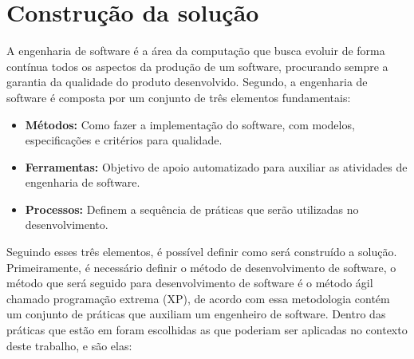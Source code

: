 \section{Construção da solução}
\label{section:construcao}

A engenharia de software é a área da computação que busca evoluir de forma contínua
todos os aspectos da produção de um software, procurando sempre a garantia da
qualidade do produto desenvolvido. Segundo\cite{pressman2011engenharia}, a engenharia
de software é composta por um conjunto de três elementos fundamentais:

\begin{itemize}
  \item \textbf{Métodos:} Como fazer a implementação do software, com modelos,
  especificações e critérios para qualidade.
  \item \textbf{Ferramentas:} Objetivo de apoio automatizado para auxiliar as atividades
  de engenharia de software.
  \item \textbf{Processos:} Definem a sequência de práticas que serão utilizadas no
  desenvolvimento.
\end{itemize}

Seguindo esses três elementos, é possível definir como será construído a solução.
Primeiramente, é necessário definir o método de desenvolvimento de software, o
método que será seguido para desenvolvimento de software é o método ágil chamado
programação extrema (XP), de acordo com\cite{796139} essa metodologia contém um
conjunto de práticas que auxiliam um engenheiro de software. Dentro das práticas
que estão em\cite{796139} foram escolhidas as que poderiam ser aplicadas no
contexto deste trabalho, e são elas:

